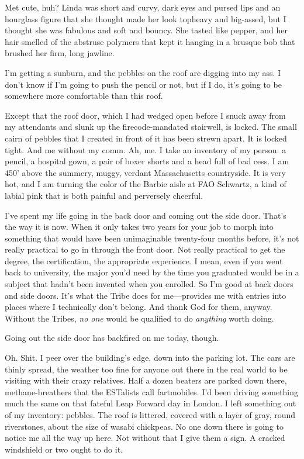 Met cute, huh? Linda was short and curvy, dark eyes and pursed lips
and an hourglass figure that she thought made her look topheavy and
big-assed, but I thought she was fabulous and soft and bouncy. She
tasted like pepper, and her hair smelled of the abstruse polymers
that kept it hanging in a brusque bob that brushed her firm, long
jawline.

I’m getting a sunburn, and the pebbles on the roof are digging into
my ass. I don’t know if I’m going to push the pencil or not, but if
I do, it’s going to be somewhere more comfortable than this roof.

Except that the roof door, which I had wedged open before I snuck
away from my attendants and slunk up the firecode-mandated
stairwell, is locked. The small cairn of pebbles that I created in
front of it has been strewn apart. It is locked tight. And me
without my comm. Ah, me. I take an inventory of my person: a
pencil, a hospital gown, a pair of boxer shorts and a head full of
bad cess. I am 450’ above the summery, muggy, verdant Massachusetts
countryside. It is very hot, and I am turning the color of the
Barbie aisle at FAO Schwartz, a kind of labial pink that is both
painful and perversely cheerful.

I’ve spent my life going in the back door and coming out the side
door. That’s the way it is now. When it only takes two years for
your job to morph into something that would have been unimaginable
twenty-four months before, it’s not really practical to go in
through the front door. Not really practical to get the degree, the
certification, the appropriate experience. I mean, even if you went
back to university, the major you’d need by the time you graduated
would be in a subject that hadn’t been invented when you enrolled.
So I’m good at back doors and side doors. It’s what the Tribe does
for me—provides me with entries into places where I technically
don’t belong. And thank God for them, anyway. Without the Tribes,
\emph{no one} would be qualified to do \emph{anything} worth
doing.

Going out the side door has backfired on me today, though.

Oh. Shit. I peer over the building’s edge, down into the parking
lot. The cars are thinly spread, the weather too fine for anyone
out there in the real world to be visiting with their crazy
relatives. Half a dozen beaters are parked down there,
methane-breathers that the ESTalists call fartmobiles. I’d been
driving something much the same on that fateful Leap Forward day in
London. I left something out of my inventory: pebbles. The roof is
littered, covered with a layer of gray, round riverstones, about
the size of wasabi chickpeas. No one down there is going to notice
me all the way up here. Not without that I give them a sign. A
cracked windshield or two ought to do it.

